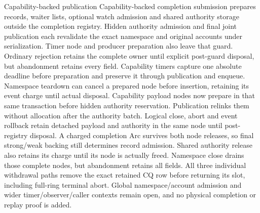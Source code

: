 \begin{implementationdetail}{Capability-backed publication}
Capability-backed completion submission prepares records, waiter lists, optional
watch admission and shared authority storage outside the completion registry.
Hidden authority admission and final joint publication each revalidate the exact
namespace and original accounts under serialization. Timer node and producer
preparation also leave that guard. Ordinary rejection retains the complete owner
until explicit post-guard disposal, but abandonment retains every field.
Capability timers capture one absolute deadline before preparation and preserve
it through publication and enqueue. Namespace teardown can cancel a prepared
node before insertion, retaining its event charge until actual disposal.
Capability payload nodes now prepare in that same transaction before hidden
authority reservation. Publication relinks them without allocation after the
authority batch. Logical close, abort and event rollback retain detached
payload and authority in the same node until post-registry disposal. A charged
completion Arc survives both node releases, so final strong/weak backing still
determines record admission. Shared authority release also retains its charge
until its node is actually freed. Namespace close drains those complete nodes, but
abandonment retains all fields. All three individual withdrawal paths remove
the exact retained CQ row before returning its slot, including full-ring
terminal abort. Global namespace/account admission and wider timer/observer/caller contexts
remain open, and no physical completion or replay proof is added.
\end{implementationdetail}

